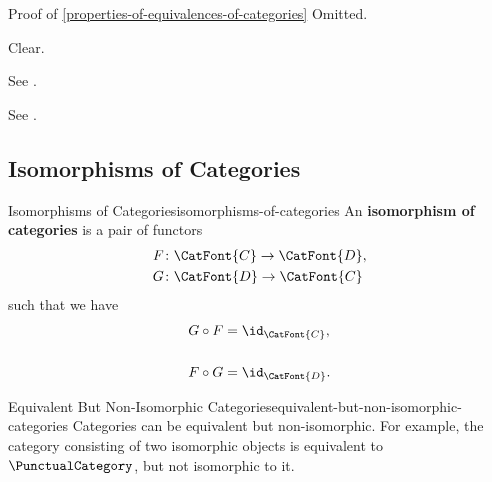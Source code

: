 \begin{Proof}{Proof of \cref{properties-of-equivalences-of-categories}}
    Omitted.

    Clear.

    See \cite[Proposition 4.4.5]{category-theory-in-context}.

    See \cite[Proposition 4.4]{nlab:groupoid}.
\end{Proof}
\subsection{Isomorphisms of Categories}\label{subsection-isomorphisms-of-categories}
\begin{definition}{Isomorphisms of Categories}{isomorphisms-of-categories}%
    An \textbf{isomorphism of categories} is a pair of functors
    \begin{align*}
        F &\colon \CatFont{C}\to\CatFont{D},\\
        G &\colon \CatFont{D}\to\CatFont{C}
    \end{align*}
    such that we have
    \begin{align*}
        G\circ F &= \id_{\CatFont{C}},\\\\
        F\circ G &= \id_{\CatFont{D}}.
    \end{align*}
\end{definition}
\begin{example}{Equivalent But Non-Isomorphic Categories}{equivalent-but-non-isomorphic-categories}%
    Categories can be equivalent but non-isomorphic. For example, the category consisting of two isomorphic objects is equivalent to $\PunctualCategory$, but not isomorphic to it.
\end{example}
